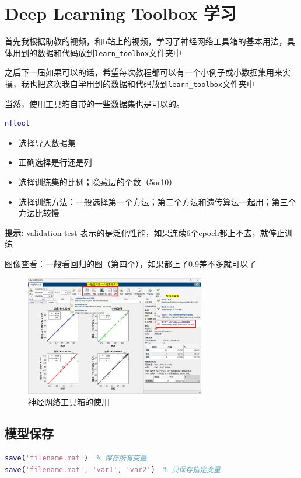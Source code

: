 \documentclass[12pt,a4paper,UTF8]{article}
\begin{document}
\clearpage %
\section{Deep Learning Toolbox 学习}

首先我根据助教的视频，和b站上的视频，学习了神经网络工具箱的基本用法，具体用到的数据和代码放到\texttt{learn\_toolbox}文件夹中

之后下一届如果可以的话，希望每次教程都可以有一个小例子或小数据集用来实操，我也把这次我自学用到的数据和代码放到\texttt{learn\_toolbox}文件夹中

当然，使用工具箱自带的一些数据集也是可以的。

\begin{lstlisting}[language=Matlab,caption=打开神经网络工具箱]
nftool
\end{lstlisting}

\begin{itemize}
    \item 选择导入数据集
    \item 正确选择是行还是列
    \item 选择训练集的比例；隐藏层的个数（5or10）
    \item 选择训练方法：一般选择第一个方法；第二个方法和遗传算法一起用；第三个方法比较慢
\end{itemize}

\textbf{提示:} validation test 表示的是泛化性能，如果连续6个epoch都上不去，就停止训练

图像查看：一般看回归的图（第四个），如果都上了0.9差不多就可以了

\begin{figure}[htbp] \centering \includegraphics[width=0.7\textwidth]{figures/2024-12-24-00-27-14.png} \caption{神经网络工具箱的使用} \label{  }\end{figure}

\subsection{模型保存}
\begin{lstlisting}[language=Matlab,caption=保存模型]
save('filename.mat')  % 保存所有变量
save('filename.mat', 'var1', 'var2')  % 只保存指定变量
\end{lstlisting}
\end{document}
